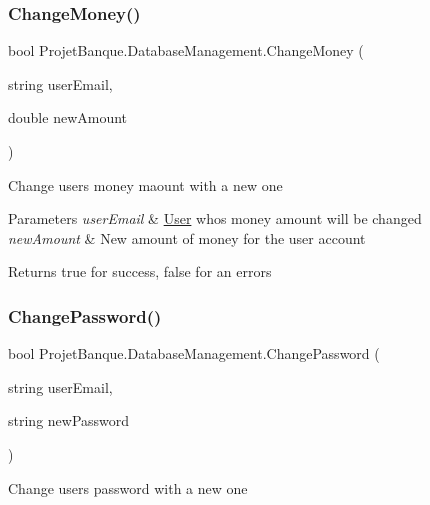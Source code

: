 \subsubsection{\texorpdfstring{ChangeMoney()}{ChangeMoney()}}
{\footnotesize\ttfamily bool Projet\+Banque.\+Database\+Management.\+Change\+Money (\begin{DoxyParamCaption}\item[{string}]{user\+Email,  }\item[{double}]{new\+Amount }\end{DoxyParamCaption})}



Change user\textquotesingle{}s money maount with a new one 


\begin{DoxyParams}{Parameters}
{\em user\+Email} & \mbox{\hyperlink{class_projet_banque_1_1_user}{User}} who\textquotesingle{}s money amount will be changed\\
\hline
{\em new\+Amount} & New amount of money for the user account\\
\hline
\end{DoxyParams}
\begin{DoxyReturn}{Returns}
true for success, false for an errors
\end{DoxyReturn}
\mbox{\label{class_projet_banque_1_1_database_management_a1bfabac5efba52fdb4f2a1209f733b91}} 
\subsubsection{\texorpdfstring{ChangePassword()}{ChangePassword()}}
{\footnotesize\ttfamily bool Projet\+Banque.\+Database\+Management.\+Change\+Password (\begin{DoxyParamCaption}\item[{string}]{user\+Email,  }\item[{string}]{new\+Password }\end{DoxyParamCaption})}



Change user\textquotesingle{}s password with a new one 


